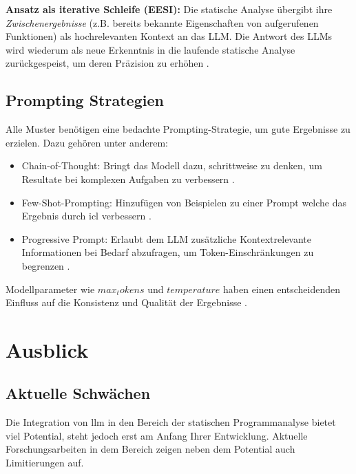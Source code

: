 \documentclass[%
    paper=A4,               %
    ngerman,
    parskip=half,           %
    11pt,                   %
    headings=normal,        %
    bibliography=totoc,     %
    listof=totoc,           %
    chapterprefix=false,    %
    appendixprefix=false,    %
    draft=false,            %
]{scrartcl}%
\begin{document}
\textbf{Ansatz als iterative Schleife (EESI):} Die statische Analyse übergibt ihre \textit{Zwischenergebnisse} (z.B. bereits bekannte Eigenschaften von aufgerufenen Funktionen) als hochrelevanten Kontext an das LLM. Die Antwort des LLMs wird wiederum als neue Erkenntnis in die laufende statische Analyse zurückgespeist, um deren Präzision zu erhöhen \cite{chapmanInterleavingStaticAnalysis2024}.


\subsection{Prompting Strategien}

Alle Muster benötigen eine bedachte Prompting-Strategie, um gute Ergebnisse zu erzielen. Dazu gehören unter anderem:

\begin{itemize}

\item Chain-of-Thought: Bringt das Modell dazu, schrittweise zu denken, um Resultate bei komplexen Aufgaben zu verbessern \cite{liEnhancingStaticAnalysis2024}.
\item Few-Shot-Prompting: Hinzufügen von Beispielen zu einer Prompt welche das  Ergebnis durch \ac{icl} verbessern \cite{khareUnderstandingEffectivenessLarge2024}.
\item Progressive Prompt: Erlaubt dem LLM zusätzliche Kontextrelevante Informationen bei Bedarf abzufragen, um Token-Einschränkungen zu begrenzen \cite{liEnhancingStaticAnalysis2024}.

\end{itemize}

Modellparameter wie $max_tokens$ und $temperature$ haben einen entscheidenden Einfluss auf die Konsistenz und Qualität der Ergebnisse \cite{wagnerEffectiveComplementarySecurity2025}.


\section{Ausblick}

\subsection{Aktuelle Schwächen}

Die Integration von \ac{llm} in den Bereich der statischen Programmanalyse bietet viel Potential, steht jedoch erst am Anfang Ihrer Entwicklung. Aktuelle Forschungsarbeiten in dem Bereich zeigen neben dem Potential auch Limitierungen auf.
\end{document}
